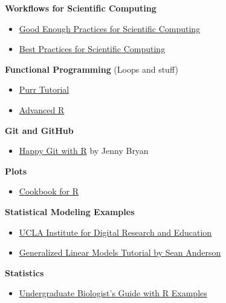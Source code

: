 \documentclass[]{book}
\providecommand{\tightlist}{%
  \setlength{\itemsep}{0pt}\setlength{\parskip}{0pt}}
\begin{document}
\textbf{Workflows for Scientific Computing}

\begin{itemize}
\tightlist
\item
  \href{http://journals.plos.org/ploscompbiol/article?id=10.1371/journal.pcbi.1005510}{Good
  Enough Practices for Scientific Computing}
\item
  \href{http://journals.plos.org/plosbiology/article?id=10.1371/journal.pbio.1001745}{Best
  Practices for Scientific Computing}
\end{itemize}

\textbf{Functional Programming} (Loops and stuff)

\begin{itemize}
\tightlist
\item
  \href{http://ctlente.com/en/purrr-magic/}{Purr Tutorial}
\item
  \href{\%22http://adv-r.had.co.nz/\%22}{Advanced R}
\end{itemize}

\textbf{Git and GitHub}

\begin{itemize}
\tightlist
\item
  \href{http://happygitwithr.com/}{Happy Git with R} by Jenny Bryan
\end{itemize}

\textbf{Plots}

\begin{itemize}
\tightlist
\item
  \href{http://www.cookbook-r.com/Graphs/}{Cookbook for R}
\end{itemize}

\textbf{Statistical Modeling Examples}

\begin{itemize}
\tightlist
\item
  \href{https://stats.idre.ucla.edu/}{UCLA Institute for Digital
  Research and Education}
\item
  \href{https://github.com/seananderson/glmm-course}{Generalized Linear
  Models Tutorial by Sean Anderson}
\end{itemize}

\textbf{Statistics}

\begin{itemize}
\tightlist
\item
  \href{https://sunsetridgemsbiology.wikispaces.com/file/view/Choosing+and+Using+Statistics.pdf}{Undergraduate
  Biologist's Guide with R Examples}
\end{itemize}
\end{document}
